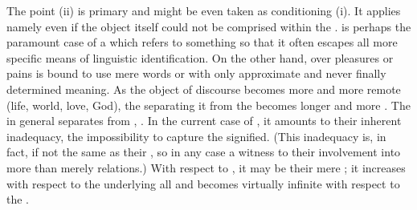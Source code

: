 \label{pa:distance}
The point (ii) is primary and might be even taken as
conditioning (i). It applies namely even if the object itself could not be
comprised within the \hoa.  is perhaps the paramount case of a
 which refers to something so  that it often escapes
all more specific means of linguistic identification. On the
other hand,  over pleasures or pains is bound to use mere words
 or  with only approximate and never finally determined
meaning. As the object of discourse becomes more and more remote (life, world,
love, God), the  separating it from the 
becomes longer and more .  The  in general separates
   from , .  In the current
  case of , it amounts to their inherent inadequacy, the impossibility to
  capture the signified. (This inadequacy is, in fact, if not the same as their
  , so in any case a witness to their involvement into 
  more than merely  relations.) With respect to ,
  it may be their mere 
  ; it increases with respect to the 
  underlying all  and becomes virtually infinite with respect
  to the .
\newp 


